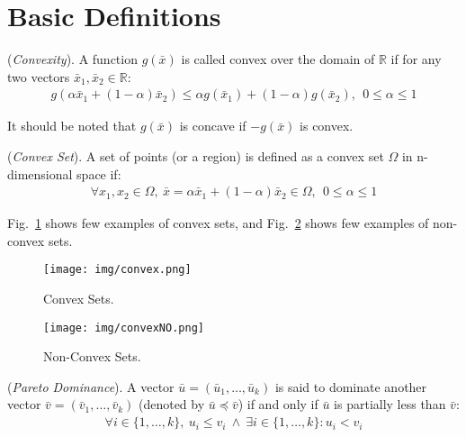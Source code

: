 \section{Basic Definitions}
%
\theoremstyle{definition}
\begin{definition}{(\textit{Convexity}).}\label{defC1}
A function $g(\bar x)$ is called convex over the domain of $\mathbb{R}$ if for any two vectors $\bar x_1, \bar x_2 \in \mathbb{R}$:
%
\begin{equation} \label{equation114}
  \begin{aligned}
    g(\alpha \bar x_1 + (1 - \alpha)\bar x_2) \leq \alpha g(\bar x_1) + (1-\alpha)g(\bar x_2), \ \ 0 \leq \alpha \leq 1
\end{aligned}
\end{equation}
%
\end{definition}
It should be noted that $g(\bar x)$ is concave if $-g(\bar x)$ is convex.
%
\theoremstyle{definition}
\begin{definition}{(\textit{Convex Set}).}\label{defC1C2}
A set of points (or a region) is defined as a convex set $\Omega$ in n-dimensional space if:
%
\begin{equation} \label{equation115}
  \begin{aligned}
    \forall x_1, x_2 \in \Omega, \ \bar x = \alpha \bar x_1 + (1-\alpha)\bar x_2 \in \Omega, \ \ 0 \leq \alpha \leq 1  
\end{aligned}
\end{equation}
%
\end{definition}
Fig.~\ref{fig_convex} shows few examples of convex sets, and Fig.~\ref{fig_concave} shows few examples of non-convex sets.
%
\begin{figure}[htbp]
	\centerline{\texttt{[image: img/convex.png]}}
	\caption{Convex Sets.}
	\label{fig_convex}
\end{figure}
%
\begin{figure}[htbp]
	\centerline{\texttt{[image: img/convexNO.png]}}
	\caption{Non-Convex Sets.}
	\label{fig_concave}
\end{figure}
%
\theoremstyle{definition}
\begin{definition}{(\textit{Pareto Dominance}).}\label{defC2}
A vector $\bar u = (\bar u_1, \ldots , \bar u_k)$ is said to dominate another vector $\bar v = (\bar v_1, \ldots , \bar v_k)$ (denoted by $\bar u \preceq \bar v$) if and only if $\bar u$ is partially less than $\bar v$:
%
\begin{equation} \label{equation116}
  \begin{aligned}
    \forall i \in \{ 1, \ldots , k\}, \ u_i \leq v_i \ \wedge \ \exists i \in \{1, \ldots , k\} :  u_i < v_i
\end{aligned}
\end{equation}
%
\end{definition}
